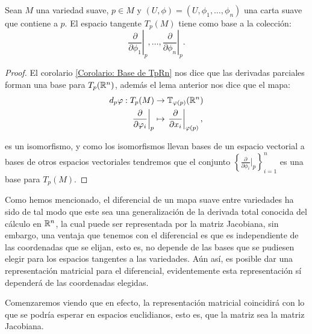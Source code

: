 \begin{theorem}
	Sean $M$ una variedad suave, $p \in M$ y $(U,\phi) = (U, \phi_1, \dots, \phi_n)$ una carta suave que contiene a $p$. El espacio tangente $T_p(M)$ tiene como base a la colección:
	\[
		\left. \frac{\partial}{\partial \phi_1} \right|_p, \hdots, \left. \frac{\partial}{\partial \phi_n} \right|_p .
	\]
\end{theorem}

\begin{proof}
	El corolario \ref{Corolario: Base de TpRn} nos dice que las derivadas parciales forman una base para $T_p(\mathbb{R}^n)$, además el lema anterior nos dice que el mapa:
	\begin{align*}
		d_p\varphi: T_p(M)                                     & \to \mathbb{T}_{\varphi(p)} (\mathbb{R}^n) \\
		\left. \frac{\partial}{\partial \varphi_i} \right|_{p} & \mapsto
		\left. \frac{\partial}{\partial x_i} \right|_{\varphi(p)},
	\end{align*}

	es un isomorfismo, y como los isomorfismos llevan bases de un espacio vectorial a bases de otros espacios vectoriales tendremos que el conjunto $\left\{ \frac{\partial}{\partial \phi_{i}}|_{p} \right\}_{i=1}^{n}$ es una base para $T_{p}(M)$.
\end{proof}

Como hemos mencionado, el diferencial de un mapa suave entre variedades ha sido de tal modo que este sea una generalización de la derivada total conocida del cálculo en $\mathbb{R}^n$, la cual puede ser representada por la matriz Jacobiana, sin embargo, una ventaja que tenemos con el diferencial es que es independiente de las coordenadas que se elijan, esto es, no depende de las bases que se pudiesen elegir para los espacios tangentes a las variedades. Aún así, es posible dar una representación matricial para el diferencial, evidentemente esta representación sí dependerá de las coordenadas elegidas.

Comenzaremos viendo que en efecto, la representación matricial coincidirá con lo que se podría esperar en espacios euclidianos, esto es, que la matriz sea la matriz Jacobiana.

